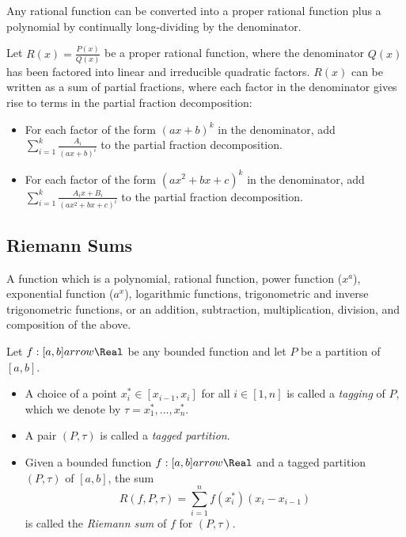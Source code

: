 \begin{theorem}
  Any rational function can be converted into a proper rational function plus a polynomial by continually long-dividing by the denominator.
\end{theorem}

\begin{theorem}
  Let $R(x) = \frac{P(x)}{Q(x)}$ be a proper rational function, where the denominator $Q(x)$ has been factored into linear and irreducible quadratic factors. $R(x)$ can be written as a sum of partial fractions, where each factor in the denominator gives rise to terms in the partial fraction decomposition:
  \begin{itemize}
    \item For each factor of the form $(ax+b)^k$ in the denominator, add $\displaystyle \sum_{i=1}^k \frac{A_i}{(ax+b)^i}$ to the partial fraction decomposition.
    \item For each factor of the form $(ax^2 + bx + c)^k$ in the denominator, add $\displaystyle \sum_{i=1}^k \frac{A_i x + B_i}{(ax^2 + bx + c)^i}$ to the partial fraction decomposition.
  \end{itemize}
\end{theorem}

\subsection*{Riemann Sums}

\begin{definition}
  A function which is a polynomial, rational function, power function ($x^a$), exponential function ($a^x$), logarithmic functions, trigonometric and inverse trigonometric functions, or an addition, subtraction, multiplication, division, and composition of the above.
\end{definition} 

\begin{definition}
  Let $f : [a, b] arrow \Real$ be any bounded function and let $P$ be a partition of $[a, b]$.
  \begin{itemize}
    \item A choice of a point ${x_i^*} \in [x_{i-1}, x_{i}]$ for all $i \in [1, n]$ is called a \textit{tagging} of $P$, which we denote by $\tau = {x_1^*, ..., x_n^*}$.
    \item A pair $(P, \tau)$ is called a \textit{tagged partition}.
    \item Given a bounded function $f : [a, b] arrow \Real$ and a tagged partition $(P, \tau)$ of $[a, b]$, the sum 
    \[
      R(f, P, \tau) = \sum_{i=1}^{n} f(x_i^*)(x_i - x_{i-1})
    \]
    is called the \textit{Riemann sum} of $f$ for $(P, \tau)$.
  \end{itemize}
\end{definition}

